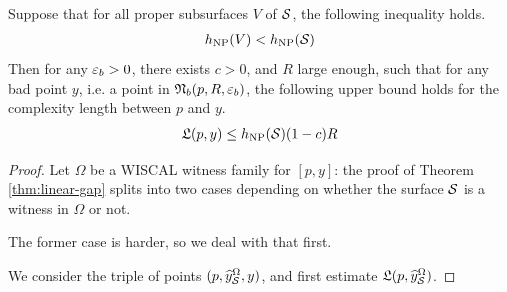 \documentclass[12pt, reqno]{amsart}
\begin{document}
\begin{theorem}
  \label{thm:linear-gap}
  Suppose that for all proper subsurfaces $V$ of $\mathcal{S}$, the following inequality holds.
  \begin{align*}
    h_{\mathrm{NP}}(V) < h_{\mathrm{NP}}(\mathcal{S})
  \end{align*}
  Then for any $\varepsilon_b > 0$, there exists $c > 0$, and $R$ large enough, such that for any bad point $y$, i.e. a point in $\mathfrak{N}_b(p, R, \varepsilon_b)$, the following upper bound holds for the complexity length between $p$ and $y$.
  \begin{align*}
    \mathfrak{L}(p, y) \leq h_{\mathrm{NP}}(\mathcal{S}) (1 - c) R
  \end{align*}
\end{theorem}

\begin{proof}


Let $\Omega$ be a WISCAL witness family for $[p, y]$: the proof of Theorem \ref{thm:linear-gap} splits into two cases depending on whether the surface $\mathcal{S}$ is a witness in $\Omega$ or not.

The former case is harder, so we deal with that first.


We consider the triple of points $(p, \widehat{y}_{\mathcal{S}}^{\Omega}, y)$, and first estimate $\mathfrak{L}(p, \widehat{y}_{\mathcal{S}}^{\Omega})$.


\end{proof}
\end{document}
